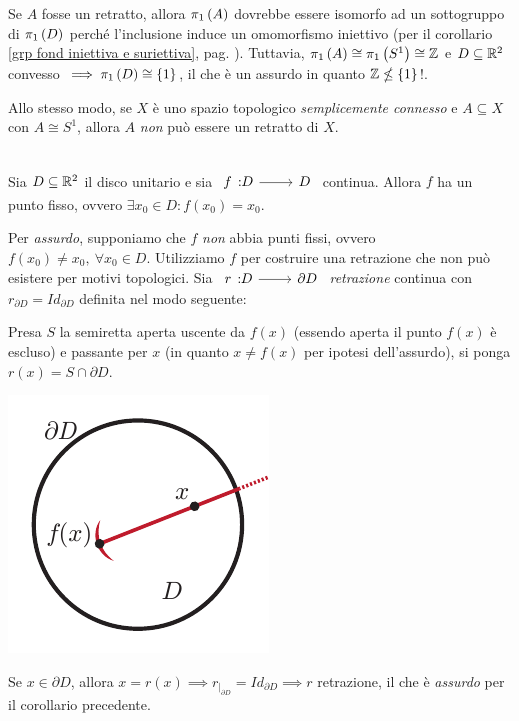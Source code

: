 \begin{demonstration}
	Se $A$ fosse un retratto, allora $\gruf{A}{\ }$ dovrebbe essere isomorfo ad un sottogruppo di $\gruf{D}{\ }$ perché l'inclusione induce un omomorfismo iniettivo (per il corollario \ref{grp fond iniettiva e suriettiva}, pag. \pageref{grp fond iniettiva e suriettiva}). Tuttavia, $\gruf{A}{\ }\cong\gruf{S^1}{\ }\cong\integerset$ e $D\subseteq\mathbb{R}^2$ convesso $\implies \gruf{D}{\ }\cong\left\{1\right\}$, il che è un assurdo in quanto $\mathbb{Z}\nleq \left\{1\right\}$!.
\end{demonstration}
\begin{observe}
	Allo stesso modo, se $X$ è uno spazio topologico \textit{semplicemente connesso} e $A\subseteq X$ con $A\cong S^1$, allora $A$ \textit{non} può essere un retratto di $X$.
\end{observe}

\begin{corollary}~{}\label{punto fisso B}\\
Sia $D\subseteq \mathbb{R}^2$ il disco unitario e sia $\funz f D D$ continua. Allora $f$ ha un punto fisso, ovvero $\exists x_0\in D \colon f(x_0)=x_0$.
\end{corollary}
\begin{demonstration}
	Per \textit{assurdo}, supponiamo che $f$ \textit{non} abbia punti fissi, ovvero $f(x_0)\neq x_0,\ \forall x_0\in D$. Utilizziamo $f$ per costruire una retrazione che non può esistere per motivi topologici. Sia $\funz r D {\partial{D}}$ \textit{retrazione} continua con $r_{\partial{D}}=Id_{\partial{D}}$ definita nel modo seguente:\\
	\begin{minipage}{.82\linewidth}
		\begin{center}
			Presa $S$ la semiretta aperta uscente da $f(x)$ (essendo aperta il punto $f(x)$ è escluso) e passante per $x$ (in quanto $x\neq f(x)$ per ipotesi dell'assurdo), si ponga $r(x)=S\cap\partial{D}$.
		\end{center}
	\end{minipage}
\begin{minipage}{.17\linewidth}
	\includegraphics[trim=0cm 0cm 0cm 0cm,clip,scale=0.5]{images/brower.pdf}
\end{minipage}
Se $x\in\partial{D}$, allora $x=r(x) \implies r_{\mid_{\partial{D}}}= Id_{\partial{D}} \implies r$ retrazione, il che è \textit{assurdo} per il corollario precedente.
\end{demonstration}

